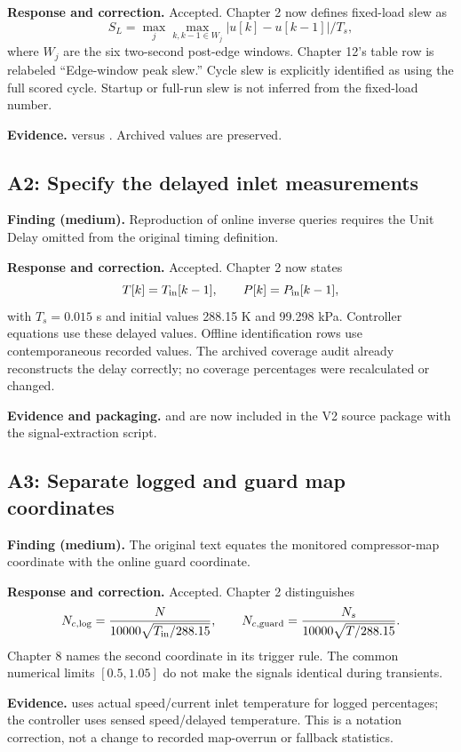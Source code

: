 \documentclass[11pt,a4paper]{article}
\newcommand{\finding}[2]{\subsection*{#1: #2}}
\begin{document}
\textbf{Response and correction.} Accepted. Chapter 2 now defines fixed-load slew as
\begin{equation*}
S_L=\max_j\max_{k,k-1\in W_j}|u[k]-u[k-1]|/T_s,
\end{equation*}
where $W_j$ are the six two-second post-edge windows. Chapter 12's table row is relabeled ``Edge-window peak slew.'' Cycle slew is explicitly identified as using the full scored cycle. Startup or full-run slew is not inferred from the fixed-load number.

\textbf{Evidence.}  versus . Archived values are preserved.

\finding{A2}{Specify the delayed inlet measurements}
\textbf{Finding (medium).} Reproduction of online inverse queries requires the Unit Delay omitted from the original timing definition.

\textbf{Response and correction.} Accepted. Chapter 2 now states
\begin{equation*}
T[k]=T_{\rm in}[k-1],\qquad P[k]=P_{\rm in}[k-1],
\end{equation*}
with $T_s=0.015$ s and initial values 288.15 K and 99.298 kPa. Controller equations use these delayed values. Offline identification rows use contemporaneous recorded values. The archived coverage audit already reconstructs the delay correctly; no coverage percentages were recalculated or changed.

\textbf{Evidence and packaging.}  and  are now included in the V2 source package with the signal-extraction script.

\finding{A3}{Separate logged and guard map coordinates}
\textbf{Finding (medium).} The original text equates the monitored compressor-map coordinate with the online guard coordinate.

\textbf{Response and correction.} Accepted. Chapter 2 distinguishes
\begin{equation*}
N_{c,\rm log}=\frac{N}{10000\sqrt{T_{\rm in}/288.15}},\qquad
N_{c,\rm guard}=\frac{N_s}{10000\sqrt{T/288.15}}.
\end{equation*}
Chapter 8 names the second coordinate in its trigger rule. The common numerical limits $[0.5,1.05]$ do not make the signals identical during transients.

\textbf{Evidence.}  uses actual speed/current inlet temperature for logged percentages; the controller uses sensed speed/delayed temperature. This is a notation correction, not a change to recorded map-overrun or fallback statistics.
\end{document}
